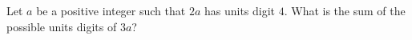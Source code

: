 Let $a$ be a positive integer such that $2a$ has units digit $4$. What is the sum of the possible units digits of $3a$?
